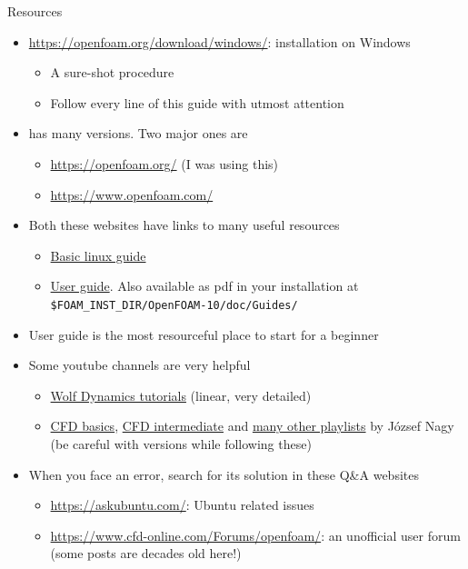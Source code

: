 \begin{frame}{Resources}
    \begin{itemize}
        \item \url{https://openfoam.org/download/windows/}: installation on Windows
        \begin{itemize}
            \item A sure-shot procedure
            \item Follow every line of this guide with utmost attention
        \end{itemize}
        \item \openfoam{} has many versions. Two major ones are
        \begin{itemize}
            \item \url{https://openfoam.org/} (I was using this)
            \item \url{https://www.openfoam.com/}
        \end{itemize}
        \item Both these websites have links to many useful resources
        \begin{itemize}
            \item \href{https://cfd.direct/openfoam/linux-guide/}{Basic linux guide}
            \item \href{https://doc.cfd.direct/openfoam/user-guide-v10/index}{User guide}. Also available as pdf in your installation at \texttt{\$FOAM\_INST\_DIR/OpenFOAM-10/doc/Guides/}
        \end{itemize}
        \item User guide is the most resourceful place to start for a beginner
        \item Some youtube channels are very helpful
        \begin{itemize}
            \item \href{https://www.youtube.com/playlist?list=PLoI86R1JVvv8JHTymlAmDChejiwm846Wl}{Wolf Dynamics  tutorials} (linear, very detailed)
            \item \href{https://www.youtube.com/playlist?list=PLcOe4WUSsMkH6DLHpsYyveaqjKxnEnQqB}{CFD basics}, \href{https://www.youtube.com/playlist?list=PLcOe4WUSsMkGPdwCpZfKcpn7w-EkgAMB8}{CFD intermediate} and \href{https://www.youtube.com/@OpenFOAMJozsefNagy/playlists}{many other playlists} by J\'{o}zsef Nagy (be careful with versions while following these)
        \end{itemize}
        \item When you face an error, search for its solution in these Q\&A websites
        \begin{itemize}
            \item \url{https://askubuntu.com/}: Ubuntu related issues
            \item \url{https://www.cfd-online.com/Forums/openfoam/}: an unofficial \openfoam{} user forum (some posts are decades old here!)
        \end{itemize}
    \end{itemize}
\end{frame}


